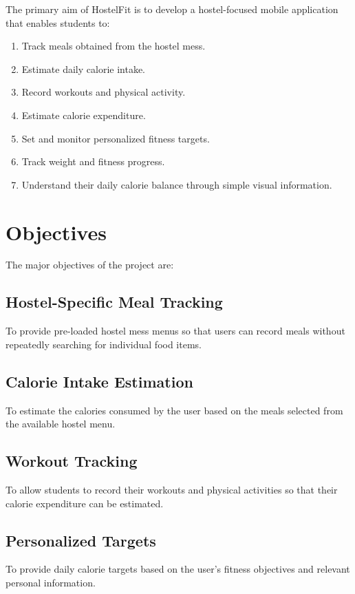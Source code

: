 \documentclass[11pt,a4paper]{article}
\begin{document}
The primary aim of HostelFit is to develop a hostel-focused mobile application that enables students to:
\begin{enumerate}
    \item Track meals obtained from the hostel mess.
    \item Estimate daily calorie intake.
    \item Record workouts and physical activity.
    \item Estimate calorie expenditure.
    \item Set and monitor personalized fitness targets.
    \item Track weight and fitness progress.
    \item Understand their daily calorie balance through simple visual information.
\end{enumerate}

\section{Objectives}

The major objectives of the project are:

\subsection{Hostel-Specific Meal Tracking}
To provide pre-loaded hostel mess menus so that users can record meals without repeatedly searching for individual food items.

\subsection{Calorie Intake Estimation}
To estimate the calories consumed by the user based on the meals selected from the available hostel menu.

\subsection{Workout Tracking}
To allow students to record their workouts and physical activities so that their calorie expenditure can be estimated.

\subsection{Personalized Targets}
To provide daily calorie targets based on the user's fitness objectives and relevant personal information.
\end{document}
